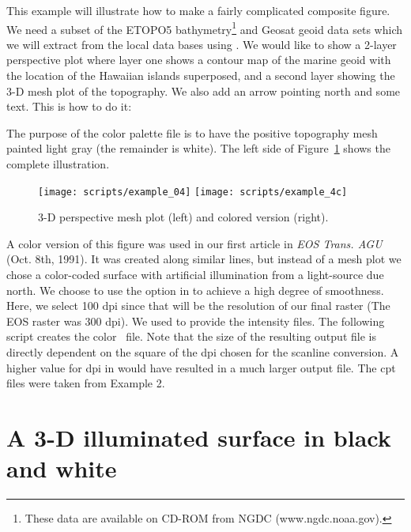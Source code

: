 This example will illustrate how to make a fairly complicated
composite figure.  We need a subset of the ETOPO5 bathymetry\footnote{
These data are available on CD-ROM from NGDC (www.ngdc.noaa.gov).}
and Geosat geoid data sets which we will extract from the local
data bases using .  We would like to show a
2-layer perspective plot where layer one shows a contour map
of the marine geoid with the location of the Hawaiian islands
superposed, and a second layer showing the 3-D mesh plot of
the topography.  We also add an arrow pointing north and some
text.  This is how to do it:


The purpose of the color palette file  is to have
the positive topography mesh painted light gray (the remainder
is white). The left side of Figure~\ref{fig:GMT_example_04} shows the complete illustration.

\begin{figure}[ht]
   \texttt{[image: scripts/example\_04]}\hfill
   \texttt{[image: scripts/example\_4c]}
   \caption{3-D perspective mesh plot (left) and colored version (right).}
   \label{fig:GMT_example_04}
\end{figure}

A color version of this figure was used in our first article in \emph{EOS
Trans. AGU} (Oct. 8th, 1991).  It was created along similar
lines, but instead of a mesh plot we chose a color-coded surface
with artificial illumination from a light-source due north.
We choose to use the  option in  to
achieve a high degree of smoothness.  Here, we select 100 dpi
since that will be the resolution of our final raster
(The EOS raster was 300 dpi). We used  to
provide the intensity files.  The following script creates
the color \PS\ file.  Note that the size of the
resulting output file is directly dependent on the square of
the dpi chosen for the scanline conversion.  A higher value
for dpi in  would have resulted in a much larger
output file.  The cpt files were taken from Example 2.



\section{A 3-D illuminated surface in black and white}

